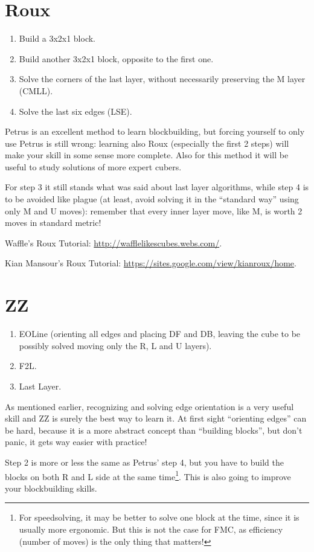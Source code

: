 \documentclass[11pt,a4paper]{book}
\begin{document}
\section{Roux}

\begin{enumerate}
\item Build a 3x2x1 block.
\item Build another 3x2x1 block, opposite to the first one.
\item Solve the corners of the last layer, without necessarily preserving the M layer (CMLL).
\item Solve the last six edges (LSE).
\end{enumerate}

Petrus is an excellent method to learn blockbuilding, but forcing yourself to only use Petrus is still wrong: learning also Roux (especially the first 2 steps) will make your skill in some sense more complete. Also for this method it will be useful to study solutions of more expert cubers.

For step 3 it still stands what was said about last layer algorithms, while step 4 is to be avoided like plague (at least, avoid solving it in the ``standard way'' using only M and U moves): remember that every inner layer move, like M, is worth 2 moves in standard metric!

Waffle's Roux Tutorial: \url{http://wafflelikescubes.webs.com/}.

Kian Mansour's Roux Tutorial: \url{https://sites.google.com/view/kianroux/home}.

\section{ZZ}
\begin{enumerate}
\item EOLine (orienting all edges and placing DF and DB, leaving the cube to be possibly solved moving only the R, L and U layers).
\item F2L.
\item Last Layer.
\end{enumerate}

As mentioned earlier, recognizing and solving edge orientation is a very useful skill and ZZ is surely the best way to learn it. At first sight ``orienting edges'' can be hard, because it is a more abstract concept than ``building blocks'', but don't panic, it gets way easier with practice!

Step 2 is more or less the same as Petrus' step 4, but you have to build the blocks on both R and L side at the same time\footnote{For speedsolving, it may be better to solve one block at the time, since it is usually more ergonomic. But this is not the case for FMC, as efficiency (number of moves) is the only thing that matters!}. This is also going to improve your blockbuilding skills.
\end{document}
